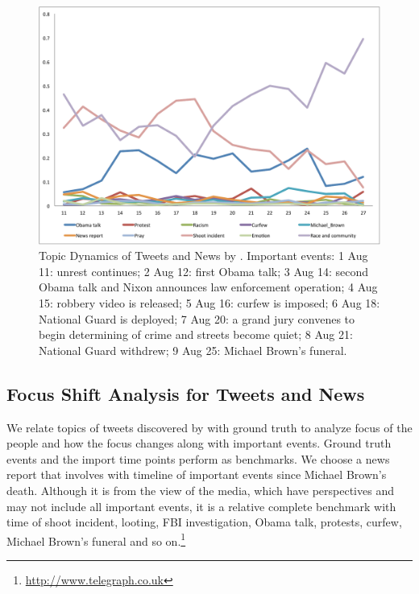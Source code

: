\begin{figure}[htpb]
\includegraphics[width=\linewidth]{figures/Legend_revised_cut.pdf}
\caption{Topic Dynamics of Tweets and News by \stlda. Important events: \textcircled{\small{1}} Aug 11: unrest continues; \textcircled{\small{2}} Aug 12: first Obama talk; \textcircled{\small{3}} Aug 14: second Obama talk and Nixon announces law enforcement operation; \textcircled{\small{4}} Aug 15: robbery video is released; \textcircled{\small{5}} Aug 16: curfew is imposed; \textcircled{\small{6}} Aug 18: National Guard is deployed; \textcircled{\small{7}} Aug 20: a grand jury convenes to begin determining of crime and streets become quiet; \textcircled{\small{8}} Aug 21: National Guard withdrew; \textcircled{\small{9}} Aug 25: Michael Brown's funeral.}\label{fig:topic_dynamics}
\end{figure}

\subsection{Focus Shift Analysis for Tweets and News}
\label{subsec:tweet_topic}
We relate topics of tweets discovered by \stlda with ground truth to analyze focus of the people and how the focus changes along with important events. Ground truth events and the import time points perform as benchmarks. We choose a news report that involves with timeline of important events since Michael Brown's death. Although it is from the view of the media, which have perspectives and may not include all important events, it is a relative complete benchmark with time of shoot incident, looting, FBI investigation, Obama talk, protests, curfew, Michael Brown's funeral and so on.\footnote{\url{http://www.telegraph.co.uk}}

